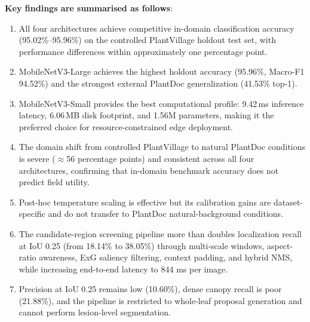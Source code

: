\documentclass[pdflatex,sn-mathphys-num]{sn-jnl}
\theoremstyle{thmstyleone}%
\theoremstyle{thmstyletwo}%
\theoremstyle{thmstylethree}%
\begin{document}
\textbf{Key findings are summarised as follows}:
\begin{enumerate}
  \item All four architectures achieve competitive in-domain classification accuracy
        (95.02\%--95.96\%) on the controlled PlantVillage holdout test set, with
        performance differences within approximately one percentage point.
  \item MobileNetV3-Large achieves the highest holdout accuracy (95.96\%, Macro-F1
        94.52\%) and the strongest external PlantDoc generalization (41.53\% top-1).
  \item MobileNetV3-Small provides the best computational profile: 9.42\,ms inference
        latency, 6.06\,MB disk footprint, and 1.56M parameters, making it the preferred
        choice for resource-constrained edge deployment.
  \item The domain shift from controlled PlantVillage to natural PlantDoc conditions is
        severe ($\approx$56 percentage points) and consistent across all four architectures,
        confirming that in-domain benchmark accuracy does not predict field utility.
  \item Post-hoc temperature scaling is effective but its calibration gains are
        dataset-specific and do not transfer to PlantDoc natural-background conditions.
  \item The candidate-region screening pipeline more than doubles localization recall at
        IoU 0.25 (from 18.14\% to 38.05\%) through multi-scale windows, aspect-ratio
        awareness, ExG saliency filtering, context padding, and hybrid NMS, while
        increasing end-to-end latency to 844 ms per image.
  \item Precision at IoU 0.25 remains low (10.60\%), dense canopy recall is poor
        (21.88\%), and the pipeline is restricted to whole-leaf proposal generation and
        cannot perform lesion-level segmentation.
\end{enumerate}
\end{document}

